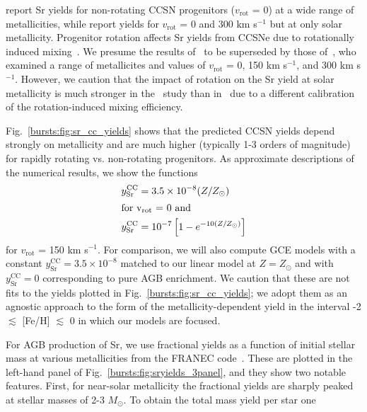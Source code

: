 \citet{Chieffi2004} report Sr yields for non-rotating CCSN progenitors 
($v_\text{rot}$ = 0) at a wide range of metallicities, while \citet{Chieffi2013} 
report yields for $v_\text{rot}$ = 0 and 300 km s$^{-1}$ but at only solar 
metallicity. Progenitor rotation affects Sr yields from CCSNe due to 
rotationally induced mixing~\citep{Frischknecht2016}. We presume the results 
of~\citet{Chieffi2013} to be superseded by those of~\citet{Limongi2018}, who 
examined a range of metallicites and values of $v_\text{rot}$ = 0, 150 km 
s$^{-1}$, and 300 km s$^{-1}$. However, we caution that the impact of rotation 
on the Sr yield at solar metallicity is much stronger in 
the~\citet{Limongi2018} study than in~\citet{Chieffi2013} due to a different 
calibration of the rotation-induced mixing efficiency. 
\par 
Fig.~\ref{bursts:fig:sr_cc_yields} shows that the predicted CCSN yields depend 
strongly on metallicity and are much higher (typically 1-3 orders of magnitude) 
for rapidly rotating vs. non-rotating progenitors. As approximate descriptions 
of the numerical results, we show the functions 
\begin{subequations}\begin{align} 
y_\text{Sr}^\text{CC} &= 3.5\times10^{-8}(Z / Z_\odot) 
\label{bursts:eq:y_sr_cc_linear} \\ 
\intertext{for v$_\text{rot}$ = 0 and} 
y_\text{Sr}^\text{CC} &= 10^{-7}\left[1 - e^{-10(Z/Z_\odot)}\right] 
\label{bursts:eq:y_sr_cc_limexp} 
\end{align}\end{subequations} 
for $v_\text{rot}$ = 150 km s$^{-1}$. For comparison, we will also compute GCE 
models with a constant $y_\text{Sr}^\text{CC} = 3.5\times10^{-8}$ matched to 
our linear model at $Z = Z_\odot$ and with $y_\text{Sr}^\text{CC} = 0$ 
corresponding to pure AGB enrichment. We caution that these are not fits to 
the yields plotted in Fig.~\ref{bursts:fig:sr_cc_yields}; we adopt them as an 
agnostic approach to the form of the metallicity-dependent yield in the 
interval -2 $\lesssim$ [Fe/H] $\lesssim$ 0 in which our models are focused. 
\par
For AGB production of Sr, we use fractional yields as a function of initial 
stellar mass at various metallicities from the FRANEC 
code~\citep{Cristallo2011}. These are plotted in the left-hand panel of 
Fig.~\ref{bursts:fig:sryields_3panel}, and they show two notable features. First, 
for near-solar metallicity the fractional yields are sharply peaked at stellar 
masses of 2-3 $M_\odot$. To obtain the total mass yield per star one 
